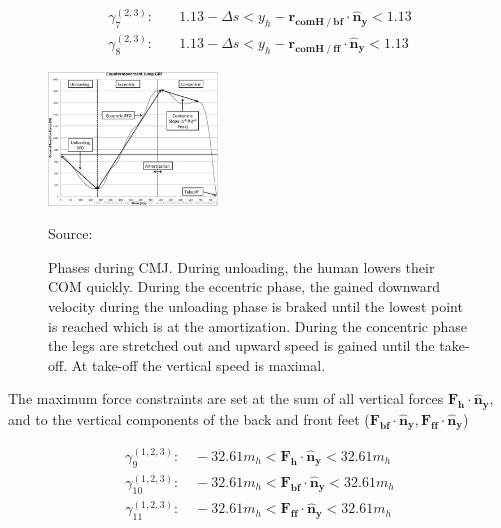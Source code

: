 \documentclass[default,iicol]{sn-jnl}
\theoremstyle{thmstyleone}%
\theoremstyle{thmstyletwo}%
\theoremstyle{thmstylethree}%
\begin{document}
\begin{equation}
\begin{split}
        \gamma_{7}^{(2,3)}:& \quad  1.13-\Delta s < y_h - \mathbf{r_{comH \mathbin{/} bf}} \cdot \mathbf{\hat n_y} < 1.13 \\ 
      \gamma_{8}^{(2,3)}:& \quad  1.13-\Delta s < y_h - \mathbf{r_{comH \mathbin{/} ff}} \cdot \mathbf{\hat n_y} < 1.13 
      \end{split}
\end{equation}

\begin{figure}
    \centering
    \includegraphics[width=0.4\textwidth]{figure/countermovementjumpRFD.jpg}
    \caption[Ground reaction force of CMJ]{Phases during CMJ. During unloading, the human lowers their COM quickly. During the eccentric phase, the gained downward velocity during the unloading phase is braked until the lowest point is reached which is at the amortization. During the concentric phase the legs are stretched out and upward speed is gained until the take-off. At take-off the vertical speed is maximal.}
    \centering \footnotesize Source: \cite{barker_relationships_2018}%
    \label{f_cmj}
\end{figure}

\noindent The maximum force constraints are set at the sum of all vertical forces $\mathbf{F_h}\cdot \mathbf{\hat n_y}$, and to the vertical components of the back and front feet ($\mathbf{F_{bf}}\cdot \mathbf{\hat n_y}, \mathbf{F_{ff}}\cdot \mathbf{\hat n_y}$)

\begin{equation}
\begin{array}{c}
    \gamma_{9}^{(1,2,3)}:\quad  -32.61 m_h < \mathbf{F_h}\cdot \mathbf{\hat n_y} < 32.61 m_h   \\
    \gamma_{10}^{(1,2,3)}:\quad  -32.61 m_h < \mathbf{F_{bf}}\cdot \mathbf{\hat n_y} < 32.61 m_h \\
    \gamma_{11}^{(1,2,3)}:\quad  -32.61 m_h < \mathbf{F_{ff}}\cdot \mathbf{\hat n_y} < 32.61 m_h \\
\end{array}
\end{equation}
\end{document}

